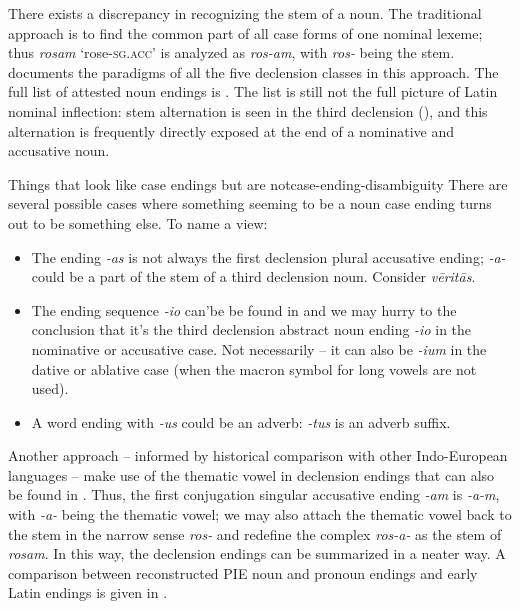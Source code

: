 \documentclass[a4paper, oneside, 12pt]{report}
\newcommand*{\citepage}[1]{p.~{#1}}
\newcommand*{\citepages}[1]{pp.~{#1}}
\newcommand{\form}[1]{\emph{#1}}
\newcommand*{\category}[1]{\textsc{#1}}
\newcommand{\translate}[1]{`#1'}
\begin{document}
There exists a discrepancy in recognizing the stem of a noun.
The traditional approach is to find the common part 
of all case forms of one nominal lexeme;
thus \form{rosam} \translate{rose-\category{sg}.\category{acc}}
is analyzed as \form{ros-am}, 
with \form{ros-} being the stem.
\citet[\citepage{17}]{allen1903allen} documents the paradigms of all the five declension classes 
in this approach.
The full list of attested noun endings is .
The list is still not the full picture of Latin nominal inflection:
stem alternation is seen in the third declension
(),
and this alternation is frequently directly exposed at the end of a nominative and accusative noun.

\begin{table}[H]
    \caption{Declension endings; Roman numerals are declension classes}
    \label{tbl:declension-ending-nouns-list}
    \centering
    
\end{table}

\begin{infobox}{Things that look like case endings but are not}{case-ending-disambiguity}
    There are several possible cases where something seeming to be a noun case ending 
    turns out to be something else.
    To name a view:
    \begin{itemize}
        \item The ending \form{-as} is not always the first declension plural accusative ending;
        \form{-a-} could be a part of the stem of a third declension noun.
        Consider \form{vēritās}.
        \item The ending sequence \form{-io} can'be be found in 
        and we may hurry to the conclusion 
        that it's the third declension abstract noun ending \form{-io} 
        in the nominative or accusative case.
        Not necessarily -- 
        it can also be \form{-ium} in the dative or ablative case 
        (when the macron symbol for long vowels are not used).
        \item A word ending with \form{-us} could be an adverb:  
            \form{-tus} is an adverb suffix.
    \end{itemize}
\end{infobox}

Another approach -- informed by historical comparison with other Indo-European languages -- 
make use of the thematic vowel 
in declension endings that can also be found in
\citep[\citepages{45, 63}]{oniga2014latin}.
Thus, the first conjugation singular accusative ending \form{-am} 
is \form{-a-m}, 
with \form{-a-} being the thematic vowel;
we may also attach the thematic vowel back to the stem in the narrow sense \form{ros-} 
and redefine the complex \form{ros-a-} as the stem of \form{rosam}.
In this way, the declension endings can be summarized in a neater way.
A comparison between reconstructed PIE noun and pronoun endings and early Latin endings
is given in \citet[\citepage{14}]{clackson2011blackwell}.
\end{document}
